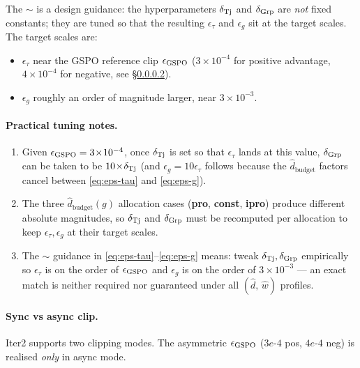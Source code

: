 \documentclass[11pt]{article}
\newcommand{\dbudget}{\hat d_{\text{budget}}}
\begin{document}
The $\sim$ is a design guidance: the hyperparameters $\delta_{\rm Tj}$
and $\delta_{\rm Grp}$ are \emph{not} fixed constants; they are tuned
so that the resulting $\epsilon_\tau$ and $\epsilon_g$ sit at the
target scales. The target scales are:
\begin{itemize}[noitemsep]
\item $\epsilon_\tau$ near the GSPO reference clip $\epsilon_{\rm GSPO}$
  ($3\!\times\!10^{-4}$ for positive advantage,
  $4\!\times\!10^{-4}$ for negative, see \S\ref{sec:async-clip}).
\item $\epsilon_g$ roughly an order of magnitude larger, near
  $3\!\times\!10^{-3}$.
\end{itemize}

\paragraph{Practical tuning notes.}
\begin{enumerate}[label=(\roman*)]
\item Given $\epsilon_{\rm GSPO} = 3\!\times\!10^{-4}$, once
  $\delta_{\rm Tj}$ is set so that $\epsilon_\tau$ lands at this value,
  $\delta_{\rm Grp}$ can be taken to be
  $10\!\times\!\delta_{\rm Tj}$ (and $\epsilon_g = 10\epsilon_\tau$
  follows because the $\dbudget$ factors cancel between \eqref{eq:eps-tau}
  and \eqref{eq:eps-g}).
\item The three $\dbudget(g)$ allocation cases
  (\textbf{pro}, \textbf{const}, \textbf{ipro}) produce different
  absolute magnitudes, so $\delta_{\rm Tj}$ and $\delta_{\rm Grp}$
  must be recomputed per allocation to keep $\epsilon_\tau,\epsilon_g$
  at their target scales.
\item The $\sim$ guidance in \eqref{eq:eps-tau}--\eqref{eq:eps-g}
  means: tweak $\delta_{\rm Tj},\delta_{\rm Grp}$ empirically so
  $\epsilon_\tau$ is on the order of $\epsilon_{\rm GSPO}$ and
  $\epsilon_g$ is on the order of $3\!\times\!10^{-3}$ --- an exact
  match is neither required nor guaranteed under all
  $(\hat d,\,\hat w)$ profiles.
\end{enumerate}

\paragraph{Sync vs async clip.}\label{sec:async-clip}
Iter2 supports two clipping modes. The asymmetric
$\epsilon_{\rm GSPO}$ ($3e\text{-}4$ pos, $4e\text{-}4$ neg) is
realised \emph{only} in async mode.
\end{document}
